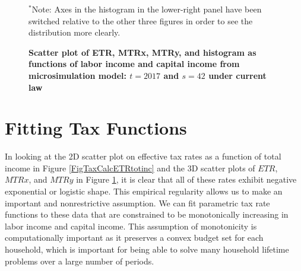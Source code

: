   \begin{figure}[t]\captionsetup{width=6.0in}
    \caption{\label{FigTaxCalc3Dtaxrates}\textbf{Scatter plot of ETR, MTRx, MTRy, and histogram as functions of labor income and capital income from microsimulation model: $t=2017$ and $s=42$ under current law}}
    \scriptsize{$^*$Note: Axes in the histogram in the lower-right panel have been switched relative to the other three figures in order to see the distribution more clearly.}
  \end{figure}


\section{Fitting Tax Functions}\label{SecTaxCalcFuncs}

  In looking at the 2D scatter plot on effective tax rates as a function of total income in Figure \ref{FigTaxCalcETRtotinc} and the 3D scatter plots of $ETR$, $MTRx$, and $MTRy$ in Figure \ref{FigTaxCalc3Dtaxrates}, it is clear that all of these rates exhibit negative exponential or logistic shape. This empirical regularity allows us to make an important and nonrestrictive assumption. We can fit parametric tax rate functions to these data that are constrained to be monotonically increasing in labor income and capital income. This assumption of monotonicity is computationally important as it preserves a convex budget set for each household, which is important for being able to solve many household lifetime problems over a large number of periods.

